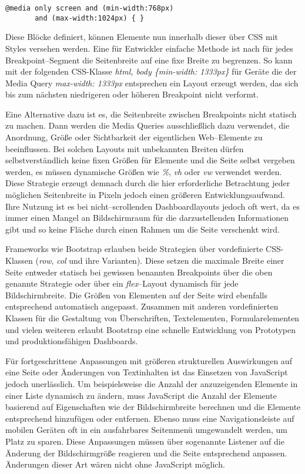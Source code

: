 \begin{verbatim}
@media only screen and (min-width:768px)
       and (max-width:1024px) { }
\end{verbatim}

Diese Blöcke definiert, können Elemente nun innerhalb dieser über CSS mit Styles versehen werden.
Eine für Entwickler einfache Methode ist nach \autocite{JiangResponsiveWebDesignModeAndApplication.2014} für jedes Breakpoint--Segment die Seitenbreite auf eine fixe Breite zu begrenzen.
So kann mit der folgenden CSS-Klasse \emph{html, body \{min-width: 1333px\}} für Geräte die der Media Query \emph{max-width: 1333px} entsprechen ein Layout erzeugt werden, das sich bis zum nächsten niedrigeren oder höheren Breakpoint nicht verformt.

Eine Alternative dazu ist es, die Seitenbreite zwischen Breakpoints nicht statisch zu machen.
Dann werden die Media Queries ausschließlich dazu verwendet, die Anordnung, Größe oder Sichtbarkeit der eigentlichen Web--Elemente zu beeinflussen.
\autocite[S. 33]{Laati.ImplementingResponsiveDesignInIndustrialDashboardEditor.2017} Bei solchen Layouts mit unbekannten Breiten dürfen selbstverständlich keine fixen Größen für Elemente und die Seite selbst vergeben werden, es müssen dynamische Größen wie \emph{\%}, \emph{vh} oder \emph{vw} verwendet werden.
Diese Strategie erzeugt demnach durch die hier erforderliche Betrachtung jeder möglichen Seitenbreite in Pixeln jedoch einen größeren Entwicklungsaufwand.
Ihre Nutzung ist es bei nicht--scrollenden Dashboardlayouts jedoch oft wert, da es immer einen Mangel an Bildschirmraum für die darzustellenden Informationen gibt und so keine Fläche durch einen Rahmen um die Seite verschenkt wird.

Frameworks wie Bootstrap \autocite{Bootstrap.BuildResponsiveSites.2024} erlauben beide Strategien über vordefinierte CSS-Klassen (\emph{row}, \emph{col} und ihre Varianten).
Diese setzen die maximale Breite einer Seite entweder statisch bei gewissen benannten Breakpoints über die oben genannte Strategie oder über ein \emph{flex}--Layout dynamisch für jede Bildschirmbreite.
Die Größen von Elementen auf der Seite wird ebenfalls entsprechend automatisch angepasst.
Zusammen mit anderen vordefinierten Klassen für die Gestaltung von Überschriften, Textelementen, Formularelementen und vielen weiteren erlaubt Bootstrap eine schnelle Entwicklung von Prototypen und produktionsfähigen Dashboards.

\autocite[S. 72]{Harmsen.2018} Für fortgeschrittene Anpassungen mit größeren strukturellen Auswirkungen auf eine Seite oder Änderungen von Textinhalten ist das Einsetzen von JavaScript jedoch unerlässlich.
Um beispielsweise die Anzahl der anzuzeigenden Elemente in einer Liste dynamisch zu ändern, muss JavaScript die Anzahl der Elemente basierend auf Eigenschaften wie der Bildschirmbreite berechnen und die Elemente entsprechend hinzufügen oder entfernen.
Ebenso muss eine Navigationsleiste auf mobilen Geräten oft in ein ausfahrbares Seitenmenü umgewandelt werden, um Platz zu sparen.
Diese Anpassungen müssen über sogenannte Listener auf die Änderung der Bildschirmgröße reagieren und die Seite entsprechend anpassen.
Änderungen dieser Art wären nicht ohne JavaScript möglich.
